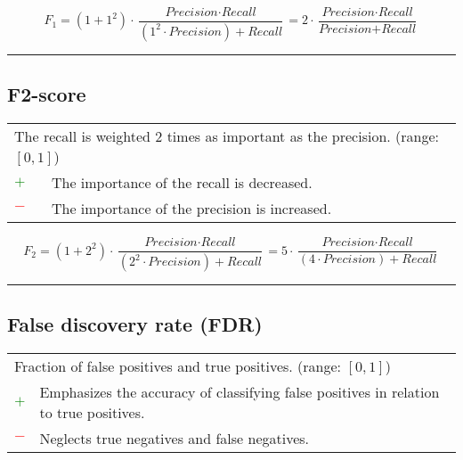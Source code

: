 \documentclass{article}
\begin{document}
\begin{equation}
	F_1 = (1 + 1^2) \cdot \dfrac{\textit{Precision} \cdot \textit{Recall}}{(1^2 \cdot \textit{Precision}) + \textit{Recall}} = 2 \cdot \dfrac{\textit{Precision} \cdot \textit{Recall}}{\textit{Precision} + \textit{Recall}}
%
	\label{equation:F1-score}
\end{equation}

\hrule


\subsection[F2-score]{F2-score \cite{van2004geometry, taha2015metrics}}

\begin{table}[H]\centering
	\begin{tabular}{m{}m{}}
		\multicolumn{2}{m{0.95\textwidth}}{The recall is weighted 2 times as important as the precision. (range: $[0, 1]$)} \\
		\textcolor{Green}{$+$} & The importance of the recall is decreased. \\
		\textcolor{Red}{$-$}   & The importance of the precision is increased.
	\end{tabular}
\end{table}

\begin{equation}
	F_2 = (1 + 2^2) \cdot \dfrac{\textit{Precision} \cdot \textit{Recall}}{(2^2 \cdot \textit{Precision}) + \textit{Recall}} = 5 \cdot \dfrac{\textit{Precision} \cdot \textit{Recall}}{(4 \cdot \textit{Precision}) + \textit{Recall}}
%
	\label{equation:F2-score}
\end{equation}

\hrule


\subsection[False discovery rate (FDR)]{False discovery rate (FDR) \cite{benjamini1995controlling, benjamini2001control}}

\begin{table}[H]\centering
	\begin{tabular}{m{}m{}}
		\multicolumn{2}{m{0.95\textwidth}}{Fraction of false positives and true positives. (range: $[0, 1]$)} \\
		\textcolor{Green}{$+$} & Emphasizes the accuracy of classifying false positives in relation to true positives. \\
		\textcolor{Red}{$-$}   & Neglects true negatives and false negatives.
	\end{tabular}
\end{table}
\end{document}
